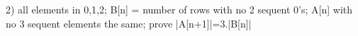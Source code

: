 2) all elements in {0,1,2}; B[n] = number of rows with no 2 sequent 0's; A[n] with no 3 sequent elements the same; prove |A[n+1]|=3.|B[n]|